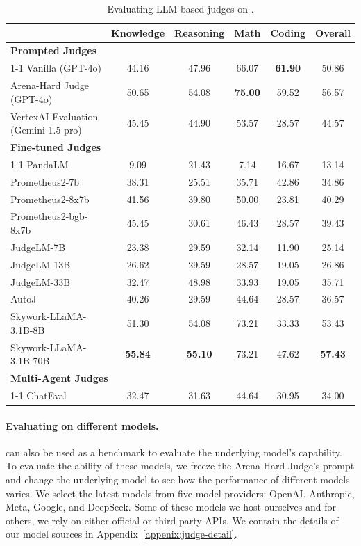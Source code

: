 \documentclass{article} %
\begin{document}
\begin{table}[h]
\centering
\begin{tabular}{lccccc}
\toprule
& Knowledge & Reasoning & Math & Coding & Overall \\ \midrule
\multicolumn{6}{l}{\textbf{Prompted Judges}} \\ \cmidrule{1-1}
Vanilla (GPT-4o)& 44.16 & 47.96 & 66.07 & \textbf{61.90} & 50.86  \\ 
Arena-Hard Judge (GPT-4o) & 50.65 & 54.08 &
\textbf{75.00} & 59.52 & 56.57 \\
VertexAI Evaluation (Gemini-1.5-pro) & 45.45 & 44.90 & 53.57 & 28.57 & 44.57 \\ \midrule
\multicolumn{6}{l}{\textbf{Fine-tuned Judges}} \\ \cmidrule{1-1}
PandaLM & 9.09 & 21.43 & 7.14 & 16.67 & 13.14  \\
Prometheus2-7b & 38.31 & 25.51 & 35.71 & 42.86 & 34.86 \\
Prometheus2-8x7b & 41.56 & 39.80 & 50.00 & 23.81 & 40.29 \\
Prometheus2-bgb-8x7b & 45.45 & 30.61 & 46.43 & 28.57 & 39.43 \\
JudgeLM-7B & 23.38 & 29.59 & 32.14 & 11.90 & 25.14 \\
JudgeLM-13B & 26.62 & 29.59 & 28.57 & 19.05 & 26.86 \\
JudgeLM-33B & 32.47 & 48.98 & 33.93 & 19.05 & 35.71 \\
AutoJ & 40.26 & 29.59 & 44.64 & 28.57 & 36.57 \\ 
Skywork-LLaMA-3.1B-8B & 51.30 & 54.08 & 73.21 & 33.33 & 53.43\\
Skywork-LLaMA-3.1B-70B & \textbf{55.84} & \textbf{55.10} & 73.21 & 47.62 & \textbf{57.43} \\
\midrule
\multicolumn{6}{l}{\textbf{Multi-Agent Judges}} \\ \cmidrule{1-1}
ChatEval & 32.47 & 31.63 & 44.64 & 30.95 & 34.00  \\ \bottomrule
\end{tabular}
\caption{Evaluating LLM-based judges on \sys.}
\label{table:multi-judge}
\end{table}


\paragraph{Evaluating \sys on different models.}
\sys can also be used as a benchmark to evaluate the underlying model's capability. To evaluate the ability of these models, we freeze the Arena-Hard Judge's prompt and change the underlying model to see how the performance of different models varies. We select the latest models from five model providers: OpenAI, Anthropic, Meta, Google, and DeepSeek. Some of these models we host ourselves and for others, we rely on either official or third-party APIs. We contain the details of our model sources in Appendix~\ref{appenix:judge-detail}.
\end{document}
